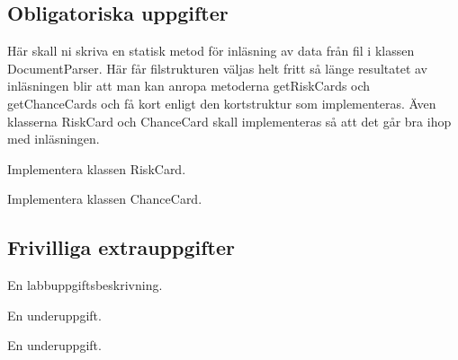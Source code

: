 \subsection{Obligatoriska uppgifter}

\Task Här skall ni skriva en statisk metod för inläsning av data från fil i klassen DocumentParser. Här får filstrukturen väljas helt fritt så länge resultatet av inläsningen blir att man kan anropa metoderna getRiskCards och getChanceCards och få kort enligt den kortstruktur som implementeras. Även klasserna RiskCard och ChanceCard skall implementeras så att det går bra ihop med inläsningen.

\Subtask Implementera klassen RiskCard.

\Subtask Implementera klassen ChanceCard.

\Task 

\subsection{Frivilliga extrauppgifter}

\Task En labbuppgiftsbeskrivning.

\Subtask En underuppgift.

\Subtask En underuppgift.
    